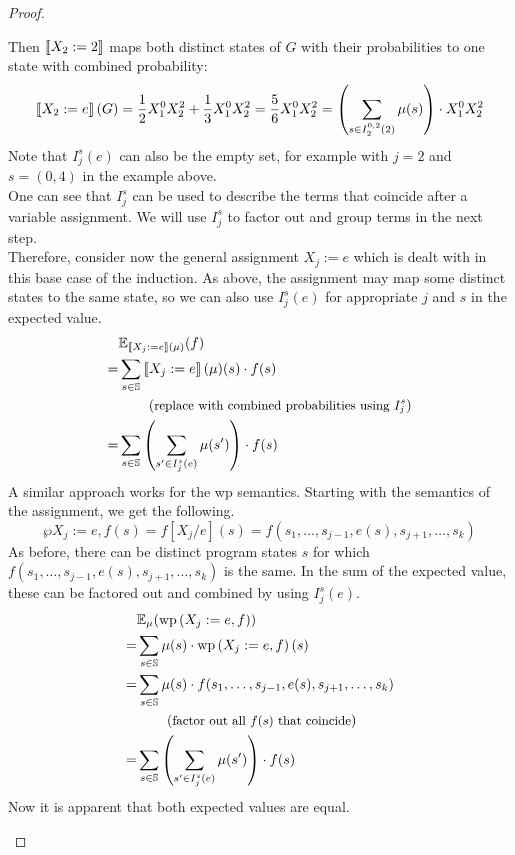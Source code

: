 \begin{theorem}
\begin{proof}
\begin{description}
				Then $\left\llbracket X_2 := 2 \right\rrbracket$ maps both distinct states of $G$ with their probabilities to one state with  combined probability:
				$$\left\llbracket X_2 := e \right\rrbracket(G) = \frac{1}{2} X_1^0 X_2^2 + \frac{1}{3} X_1^0 X_2^2
					= \frac{5}{6} X_1^0 X_2^2 = \left( \sum_{s \in I_2^{0, 2}(2)} \mu(s) \right) \cdot X_1^0 X_2^2 $$
				Note that $I_j^s(e)$ can also be the empty set, for example with $j = 2$ and $s = (0, 4)$ in the example above. \\
				One can see that $I_j^s$ can be used to describe the terms that coincide after a variable assignment. 
				We will use $I_j^s$ to factor out and group terms in the next step. \\
				Therefore, consider now the general assignment $X_j := e$ which is dealt with in this base case of the induction.
				As above, the assignment may map some distinct states to the same state, so we can also use $I_j^s(e)$ for appropriate $j$ and $s$ in the expected value.
				\begin{align*}
				  & \mathbb{E}_{\left\llbracket X_j := e \right\rrbracket(\mu)} (f) \\
				= & \sum_{s \in \mathbb{S}} \left\llbracket X_j := e \right\rrbracket(\mu)(s) \cdot f(s) \\
				  & \hspace*{2em} \left(\text{\small replace with combined probabilities using $I_j^s$}\right)  \\
				= & \sum_{s \in \mathbb{S}} \left( \sum_{s' \in I_j^s(e)} \mu(s') \right) \cdot f(s) \\
				\end{align*}
				A similar approach works for the wp semantics.
				Starting with the semantics of the assignment, we get the following.
				$$ \wp{X_j := e, f}(s) = f[X_j/e](s) = f(s_1, \dots, s_{j-1}, e(s), s_{j+1}, \dots, s_k) $$
				As before, there can be distinct program states $s$ for which $f(s_1, \dots, s_{j-1}, e(s), s_{j+1}, \dots, s_k)$ is the same.
				In the sum of the expected value, these can be factored out and combined by using $I_j^s(e)$.
				\begin{align*}
				  & \mathbb{E}_\mu (\operatorname{wp}\left( X_j := e, f \right)) \\
				= & \sum_{s \in \mathbb{S}} \mu(s) \cdot \operatorname{wp}\left( X_j := e, f \right)(s) \\
				= & \sum_{s \in \mathbb{S}} \mu(s) \cdot f(s_1, \dots, s_{j-1}, e(s), s_{j+1}, \dots, s_k) \\
				  & \hspace*{2em} \left(\text{\small factor out all $f(s)$ that coincide}\right) \\
				= & \sum_{s \in \mathbb{S}} \left( \sum_{s' \in I_j^s(e)} \mu(s') \right) \cdot f(s)
				\end{align*}
				Now it is apparent that both expected values are equal.
		\end{description}

\end{proof}
\end{theorem}
